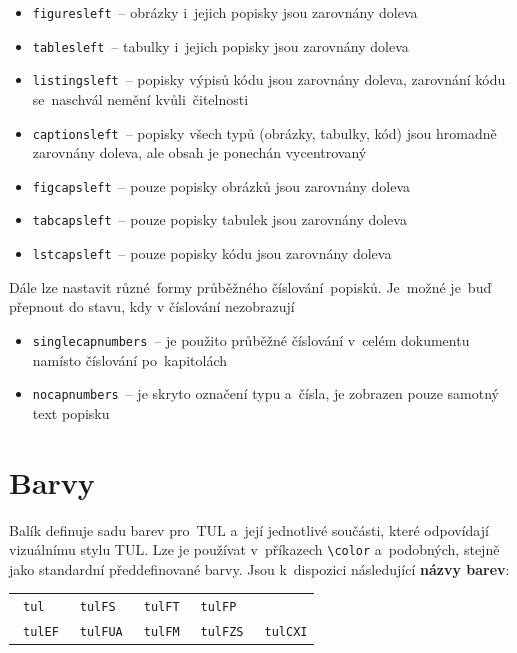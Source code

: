 \documentclass[a4paper,12pt,fonts,numbering,listingsleft]{./tulpackage/tularticle}
\newcommand{\cmdfont}[1]{\texttt{\color{\tulcolor}#1}}
\newcommand{\cmdnoindex}[1]{\cmdfont{\textbackslash{}#1}}
\newcommand{\demobox}{\raisebox{-.20ex}{\rule{1em}{1em}}}
\begin{document}
\begin{itemize}[label={}, leftmargin=0pt]
    \raggedright%
    \item \cmdfont{figuresleft}~-- obrázky i~jejich popisky jsou zarovnány doleva
    \item \cmdfont{tablesleft}~-- tabulky i~jejich popisky jsou zarovnány doleva
    \item \cmdfont{listingsleft}~-- popisky výpisů kódu jsou zarovnány doleva,
    zarovnání kódu se~naschvál nemění kvůli~čitelnosti
    \item \cmdfont{captionsleft}~-- popisky všech typů (obrázky, tabulky, kód)
    jsou hromadně zarovnány doleva, ale obsah je ponechán vycentrovaný
    \item \cmdfont{figcapsleft}~-- pouze popisky obrázků jsou zarovnány doleva
    \item \cmdfont{tabcapsleft}~-- pouze popisky tabulek jsou zarovnány doleva
    \item \cmdfont{lstcapsleft}~-- pouze popisky kódu jsou zarovnány doleva
\end{itemize}

\bigskip
\medskip

Dále lze nastavit různé~formy průběžného číslování~popisků. Je~možné je~buď přepnout
do stavu, kdy v číslování nezobrazují

\bigskip

\begin{itemize}[label={}, leftmargin=0pt]
    \raggedright%
    \item \cmdfont{singlecapnumbers}~-- je použito průběžné číslování v~celém dokumentu
    namísto číslování po~kapitolách
    \item \cmdfont{nocapnumbers}~-- je skryto označení typu a~čísla, je zobrazen pouze
    samotný text popisku
\end{itemize}

\clearpage

\section{Barvy}

Balík definuje sadu barev pro~TUL a~její jednotlivé součásti, které odpovídají
vizuálnímu stylu TUL\@. Lze je používat v~příkazech \cmdnoindex{color} a~podobných,
stejně jako standardní předdefinované barvy. Jsou k~dispozici následující
\textbf{názvy barev}:

\begin{center}
    \begin{tabular}{l@{\qquad}l@{\qquad}l@{\qquad}l@{\qquad}l}
        {\color{tul}\demobox}\ \cmdfont{tul}       &
        {\color{tulFS}\demobox}\ \cmdfont{tulFS}   &
        {\color{tulFT}\demobox}\ \cmdfont{tulFT}   &
        {\color{tulFP}\demobox}\ \cmdfont{tulFP}     \\
        {\color{tulEF}\demobox}\ \cmdfont{tulEF}   &
        {\color{tulFUA}\demobox}\ \cmdfont{tulFUA} &
        {\color{tulFM}\demobox}\ \cmdfont{tulFM}   &
        {\color{tulFZS}\demobox}\ \cmdfont{tulFZS} &
        {\color{tulCXI}\demobox}\ \cmdfont{tulCXI}
    \end{tabular}
\end{center}
\end{document}
